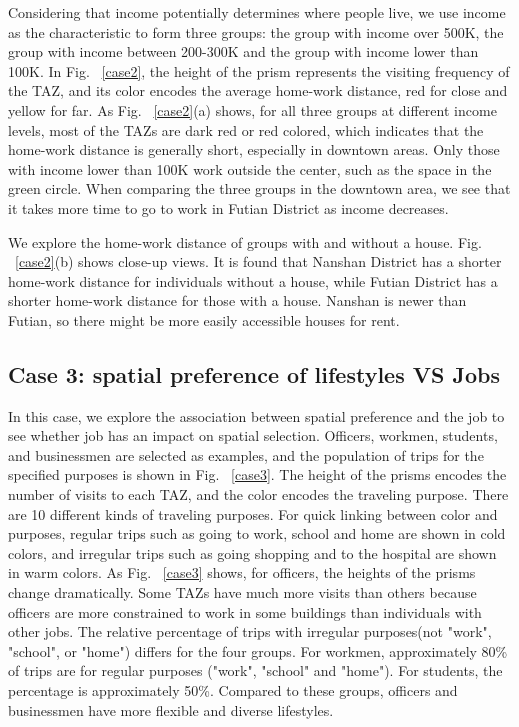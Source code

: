 \documentclass{ieeeaccess}
\begin{document}
Considering that income potentially determines where people live, we use income as the characteristic to form three groups: the group with income over 500K, the group with income between 200-300K and the group with income lower than 100K. In Fig. ~\ref{case2}, the height of the prism represents the visiting frequency of the TAZ, and its color encodes the average home-work distance, red for close and yellow for far. As Fig. ~\ref{case2}(a) shows, for all three groups at different income levels, most of the TAZs are dark red or red colored, which indicates that the home-work distance is generally short, especially in downtown areas. Only those with income lower than 100K work outside the center, such as the space in the green circle. When comparing the three groups in the downtown area, we see that it takes more time to go to work in Futian District as income decreases.

We explore the home-work distance of groups with and without a house. Fig. ~\ref{case2}(b) shows close-up views. It is found that Nanshan District has a shorter home-work distance for individuals without a house, while Futian District has a shorter home-work distance for those with a house. Nanshan is newer than Futian, so there might be more easily accessible houses for rent.



\subsection{Case 3: spatial preference of lifestyles VS Jobs}
In this case, we explore the association between spatial preference and the job to see whether job has an impact on spatial selection. Officers, workmen, students, and businessmen are selected as examples, and the population of trips for the specified purposes is shown in Fig. ~\ref{case3}. The height of the prisms encodes the number of visits to each TAZ, and the color encodes the traveling purpose. There are 10 different kinds of traveling purposes. For quick linking between color and purposes, regular trips such as going to work, school and home are shown in cold colors, and irregular trips such as going shopping and to the hospital are shown in warm colors. As Fig. ~\ref{case3} shows, for officers, the heights of the prisms change dramatically. Some TAZs have much more visits than others because officers are more constrained to work in some buildings than individuals with other jobs. The relative percentage of trips with irregular purposes(not "work", "school", or "home") differs for the four groups. For workmen, approximately 80\% of trips are for regular purposes ("work", "school" and "home"). For students, the percentage is approximately 50\%. Compared to these groups, officers and businessmen have more flexible and diverse lifestyles.
\end{document}
